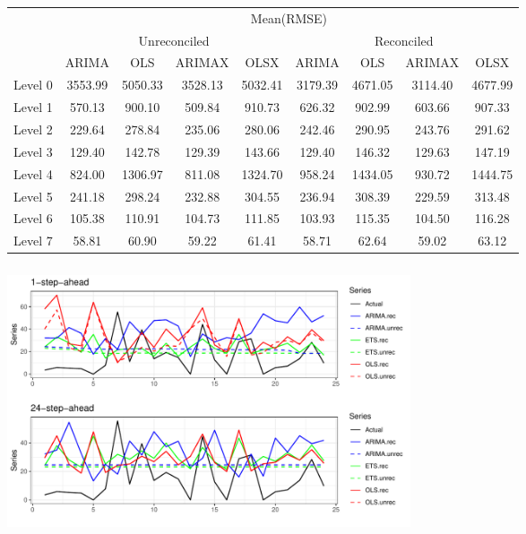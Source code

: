 \documentclass[11pt,a4paper,]{article}
\let\origfigure\figure
\let\endorigfigure\endfigure
\renewenvironment{figure}[1][2] {
    \expandafter\origfigure\expandafter[htbp]
} {
    \endorigfigure
}
\let\origtable\table
\let\endorigtable\endtable
\renewenvironment{table}[1][2] {
    \expandafter\origtable\expandafter[htbp]
} {
    \endorigtable
}
\begin{document}
\begin{table}[t]

\caption{\label{tab:easterRMSE}Mean(RMSE) for ARIMAX and OLSX, adding easter information, with and without reconciliation - 24-step-ahead - Tourism dataset}
\centering
\begin{tabular}{ccccccccc}
\toprule
\multicolumn{1}{c}{} & \multicolumn{8}{c}{Mean(RMSE)} \\
\cmidrule(l{3pt}r{3pt}){2-9}
\multicolumn{1}{c}{} & \multicolumn{4}{c}{Unreconciled} & \multicolumn{4}{c}{Reconciled} \\
\cmidrule(l{3pt}r{3pt}){2-5} \cmidrule(l{3pt}r{3pt}){6-9}
 & ARIMA & OLS & ARIMAX & OLSX & ARIMA & OLS & ARIMAX & OLSX\\
\midrule
Level 0 & 3553.99 & 5050.33 & 3528.13 & 5032.41 & 3179.39 & 4671.05 & 3114.40 & 4677.99\\
Level 1 & 570.13 & 900.10 & 509.84 & 910.73 & 626.32 & 902.99 & 603.66 & 907.33\\
Level 2 & 229.64 & 278.84 & 235.06 & 280.06 & 242.46 & 290.95 & 243.76 & 291.62\\
Level 3 & 129.40 & 142.78 & 129.39 & 143.66 & 129.40 & 146.32 & 129.63 & 147.19\\
Level 4 & 824.00 & 1306.97 & 811.08 & 1324.70 & 958.24 & 1434.05 & 930.72 & 1444.75\\
Level 5 & 241.18 & 298.24 & 232.88 & 304.55 & 236.94 & 308.39 & 229.59 & 313.48\\
Level 6 & 105.38 & 110.91 & 104.73 & 111.85 & 103.93 & 115.35 & 104.50 & 116.28\\
Level 7 & 58.81 & 60.90 & 59.22 & 61.41 & 58.71 & 62.64 & 59.02 & 63.12\\
\bottomrule
\end{tabular}
\end{table}

\begin{figure}

{\centering \includegraphics[width=450px,height=300px]{hcf_files/figure-latex/forecstrolling24tourism-1} 

}

\caption{Comparing Actual test set, Reconciled and unreconciled ETS, ARIMA and OLS for BACBus bottom level series for 1-step-ahead and 24-step-ahead tourism demand}\label{fig:forecstrolling24tourism}
\end{figure}
\end{document}
